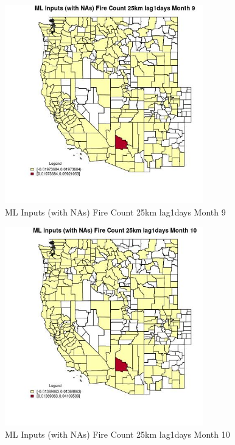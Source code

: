 \begin{figure} 
\centering  
\includegraphics[width=0.77\textwidth]{Code_Outputs/Report_ML_input_PM25_Step4_part_e_de_duplicated_aves_compiled_2019-05-20wNAs_CountyFire_Count_25km_lag1daysmedianMonth9.jpg} 
\caption{\label{fig:Report_ML_input_PM25_Step4_part_e_de_duplicated_aves_compiled_2019-05-20wNAsCountyFire_Count_25km_lag1daysmedianMonth9}ML Inputs (with NAs) Fire Count 25km lag1days Month 9} 
\end{figure} 
 

\begin{figure} 
\centering  
\includegraphics[width=0.77\textwidth]{Code_Outputs/Report_ML_input_PM25_Step4_part_e_de_duplicated_aves_compiled_2019-05-20wNAs_CountyFire_Count_25km_lag1daysmedianMonth10.jpg} 
\caption{\label{fig:Report_ML_input_PM25_Step4_part_e_de_duplicated_aves_compiled_2019-05-20wNAsCountyFire_Count_25km_lag1daysmedianMonth10}ML Inputs (with NAs) Fire Count 25km lag1days Month 10} 
\end{figure} 
 

